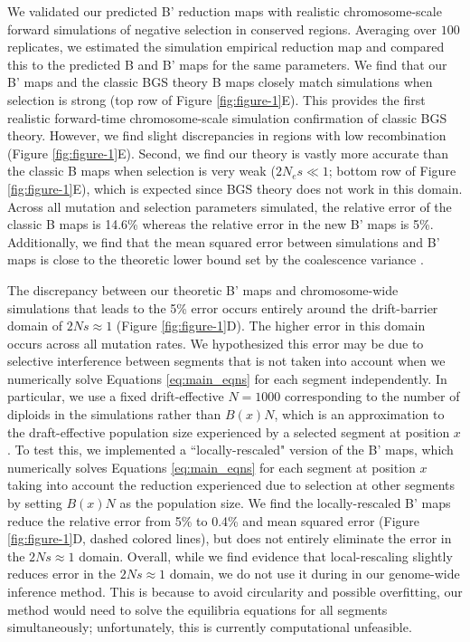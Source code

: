 \documentclass[11pt]{article}
\begin{document}
We validated our predicted B' reduction maps with realistic chromosome-scale
forward simulations of negative selection in conserved regions. Averaging over
$100$ replicates, we estimated the simulation empirical reduction map and
compared this to the predicted B and B' maps for the same parameters. We find
that our B' maps and the classic BGS theory B maps closely match simulations
when selection is strong (top row of Figure \ref{fig:figure-1}E). This provides
the first realistic forward-time chromosome-scale simulation confirmation of
classic BGS theory. However, we find slight discrepancies in regions with low
recombination (Figure \ref{fig:figure-1}E). Second, we find our theory is
vastly more accurate than the classic B maps when selection is very weak ($2N_e
s \ll 1$; bottom row of Figure \ref{fig:figure-1}E), which is expected since
BGS theory does not work in this domain. Across all mutation and selection
parameters simulated, the relative error of the classic B maps is 14.6\%
whereas the relative error in the new B' maps is 5\%. Additionally, we find
that the mean squared error between simulations and B' maps is close to the
theoretic lower bound set by the coalescence variance
\parencite{Tajima1983-gu}.

The discrepancy between our theoretic B' maps and chromosome-wide simulations
that leads to the 5\% error occurs entirely around the drift-barrier domain of
$2Ns \approx 1$ (Figure \ref{fig:figure-1}D). The higher error in this domain
occurs across all mutation rates. We hypothesized this error may be due to
selective interference between segments that is not taken into account when we
numerically solve Equations \eqref{eq:main_eqns} for each segment
independently. In particular, we use a fixed drift-effective $N=1000$
corresponding to the number of diploids in the simulations rather than $B(x)
N$, which is an approximation to the draft-effective population size
experienced by a selected segment at position $x$. To test this, we implemented
a ``locally-rescaled" version of the B' maps, which numerically solves
Equations \eqref{eq:main_eqns} for each segment at position $x$ taking into
account the reduction experienced due to selection at other segments by setting
$B(x)N$ as the population size. We find the locally-rescaled B' maps reduce the
relative error from 5\% to 0.4\% and mean squared error (Figure
\ref{fig:figure-1}D, dashed colored lines), but does not entirely eliminate the
error in the $2Ns \approx 1$ domain. Overall, while we find evidence that
local-rescaling slightly reduces error in the $2Ns \approx 1$ domain, we do not
use it during in our genome-wide inference method. This is because to avoid
circularity and possible overfitting, our method would need to solve the
equilibria equations for all segments simultaneously; unfortunately, this is
currently computational unfeasible.
\end{document}
